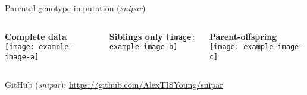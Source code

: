 \begin{frame}[fragile]{Parental genotype imputation (\textit{snipar})}

  \begin{columns}
    \begin{column}{0.30\textwidth}
      \begin{center}
        {\bfseries\color{ccgblue} Complete data}
        \texttt{[image: example-image-a]}
      \end{center}
    \end{column}

    \begin{column}{0.30\textwidth}
      \begin{center}
        {\bfseries\color{ccgblue} Siblings only}
        \texttt{[image: example-image-b]}
      \end{center}
    \end{column}

    \begin{column}{0.30\textwidth}
      \begin{center}
        {\bfseries\color{ccgblue} Parent-offspring}
        \texttt{[image: example-image-c]}
      \end{center}
    \end{column}

  \end{columns}

  \vfill

  \begin{center}
    GitHub (\textit{snipar}): \url{https://github.com/AlexTISYoung/snipar}
  \end{center}

\end{frame}






















